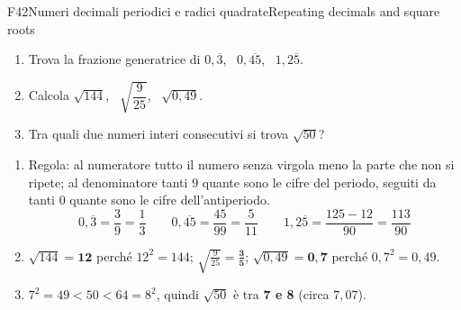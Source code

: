 \begin{esercizio}{F4}{2}{Numeri decimali periodici e radici quadrate}{Repeating decimals and square roots}
\begin{enumerate}
\item Trova la frazione generatrice di $0,\overline{3}$, \ $0,\overline{45}$, \ $1,2\overline{5}$.
\item Calcola $\sqrt{144}$, \ $\sqrt{\dfrac{9}{25}}$, \ $\sqrt{0,49}$.
\item Tra quali due numeri interi consecutivi si trova $\sqrt{50}$?
\end{enumerate}
\end{esercizio}
\begin{solbox}
\begin{enumerate}
\item Regola: al numeratore tutto il numero senza virgola meno la parte che non si ripete; al denominatore tanti $9$ quante sono le cifre del periodo, seguiti da tanti $0$ quante sono le cifre dell'antiperiodo.
\[0,\overline{3}=\frac39=\frac13\qquad 0,\overline{45}=\frac{45}{99}=\frac{5}{11}\qquad 1,2\overline{5}=\frac{125-12}{90}=\frac{113}{90}\]
\item $\sqrt{144}=\mathbf{12}$ perché $12^2=144$; \quad $\sqrt{\frac{9}{25}}=\mathbf{\frac35}$; \quad $\sqrt{0,49}=\mathbf{0,7}$ perché $0,7^2=0,49$.
\item $7^2=49<50<64=8^2$, quindi $\sqrt{50}$ è tra \textbf{7 e 8} (circa $7,07$).
\end{enumerate}
\end{solbox}

